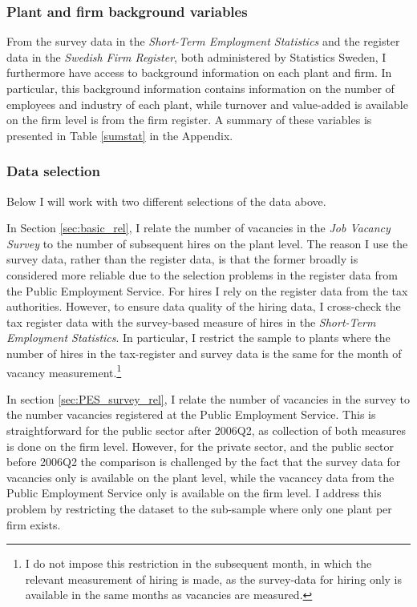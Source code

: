 \subsubsection{Plant and firm background variables}

From the survey data in the \emph{Short-Term Employment Statistics} and the register data in the \emph{Swedish Firm Register}, both administered by Statistics Sweden, I furthermore have access to background information on each plant and firm. In particular, this background information contains information on the number of employees and industry of each plant, while turnover and value-added is available on the firm level is from the firm register. A summary of these variables is presented in Table \ref{sumstat} in the Appendix. 

\subsubsection{Data selection}

Below I will work with two different selections of the data above. 

In Section \ref{sec:basic_rel}, I relate the number of vacancies in the \textit{Job Vacancy Survey} to the number of subsequent hires on the plant level. The reason I use the survey data, rather than the register data, is that the former broadly is considered more reliable due to the selection problems in the register data from the Public Employment Service. For hires I rely on the register data from the tax authorities. However, to ensure data quality of the hiring data, I cross-check the tax register data with the survey-based measure of hires in the \emph{Short-Term Employment Statistics}. In particular, I restrict the sample to plants where the number of hires in the tax-register and survey data is the same for the month of vacancy measurement.\footnote{I do not impose this restriction in the subsequent month, in which the relevant measurement of hiring is made, as the survey-data for hiring only is available in the same months as vacancies are measured.} 

In section \ref{sec:PES_survey_rel}, I relate the number of vacancies in the survey to the number vacancies registered at the Public Employment Service. This is straightforward for the public sector after 2006Q2, as collection of both measures is done on the firm level. However, for the private sector, and the public sector before 2006Q2 the comparison is challenged by the fact that the survey data for vacancies only is available on the plant level, while the vacanccy data from the Public Employment Service only is available on the firm level. I address this problem by restricting the dataset to the sub-sample where only one plant per firm exists. 
 
